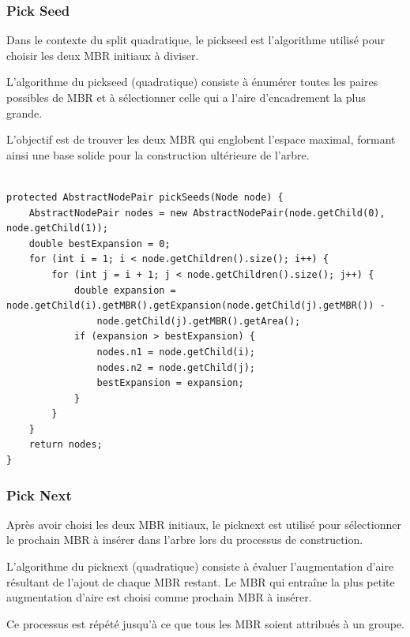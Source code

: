 \documentclass {article}
\begin{document}
\subsubsection {Pick Seed}


Dans le contexte du split quadratique, le pickseed est l'algorithme utilisé pour choisir les
deux MBR initiaux à diviser.

L'algorithme du pickseed (quadratique) consiste à énumérer toutes les paires possibles de MBR et à sélectionner
celle qui a l'aire d'encadrement la plus grande.

L'objectif est de trouver les deux MBR qui englobent l'espace maximal, formant ainsi une base solide
pour la construction ultérieure de l'arbre.

\begin{verbatim}

protected AbstractNodePair pickSeeds(Node node) {
    AbstractNodePair nodes = new AbstractNodePair(node.getChild(0), node.getChild(1));
    double bestExpansion = 0;
    for (int i = 1; i < node.getChildren().size(); i++) {
        for (int j = i + 1; j < node.getChildren().size(); j++) {
            double expansion = node.getChild(i).getMBR().getExpansion(node.getChild(j).getMBR()) -
                node.getChild(j).getMBR().getArea();
            if (expansion > bestExpansion) {
                nodes.n1 = node.getChild(i);
                nodes.n2 = node.getChild(j);
                bestExpansion = expansion;
            }
        }
    }
    return nodes;
}

\end{verbatim}


\subsubsection {Pick Next}

Après avoir choisi les deux MBR initiaux, le picknext est utilisé pour sélectionner le prochain MBR
à insérer dans l'arbre lors du processus de construction.

L'algorithme du picknext (quadratique) consiste à évaluer l'augmentation d'aire résultant de l'ajout de chaque MBR
restant. Le MBR qui entraîne la plus petite augmentation d'aire est choisi
comme prochain MBR à insérer.

Ce processus est répété jusqu'à ce que tous les MBR soient attribués à un groupe.
\end{document}
